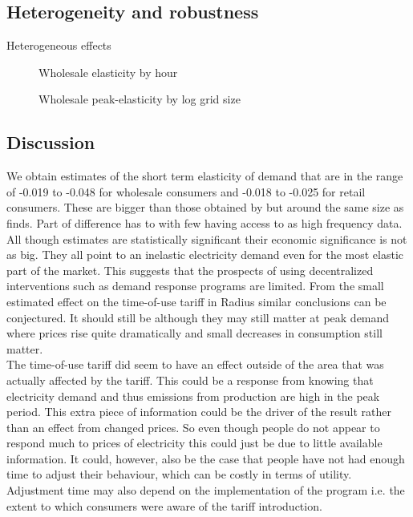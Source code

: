 \subsection{Heterogeneity and robustness}
\label{subsec:r_robustness}


Heterogeneous effects
\begin{figure}[H]
  \centering
  \caption{Wholesale elasticity by hour}
  \label{fig:ws_elasticity_hour}
\end{figure}

\begin{figure}[H]
  \centering
  \caption{Wholesale peak-elasticity by log grid size}
  \label{fig:ws_elasticity_grid}
\end{figure}


\subsection{Discussion}
\label{subsec:r_discussion}
We obtain estimates of the short term elasticity of demand that are in the range of -0.019 to -0.048 for wholesale consumers and -0.018 to -0.025 for retail consumers. These are bigger than those obtained by \cite{lijesen2007real} but around the same size as \cite{wolak2001impact} finds. Part of difference has to with few having access to as high frequency data.  %
All though estimates are statistically significant their economic significance is not as big. They all point to an inelastic electricity demand even for the most elastic part of the market. This suggests that the prospects of using decentralized interventions such as demand response programs are limited. From the small estimated effect on the time-of-use tariff in Radius similar conclusions can be conjectured. It should still be although they may still matter at peak demand where prices rise quite dramatically and small decreases in consumption still matter. 
\smallskip \\ 

The time-of-use tariff did seem to have an effect outside of the area that was actually affected by the tariff. This could be a response from knowing that electricity demand and thus emissions from production are high in the peak period. This extra piece of information could be the driver of the result rather than an effect from changed prices. So even though people do not appear to respond much to prices of electricity this could just be due to little available information. It could, however, also be the case that people have not had enough time to adjust their behaviour, which can be costly in terms of utility. Adjustment time may also depend on the implementation of the program i.e. the extent to which consumers were aware of the tariff introduction. 
\smallskip \\

